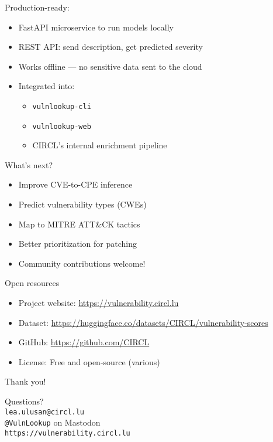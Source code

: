 \documentclass{beamer}
\begin{document}
\begin{frame}{Production-ready: }
    \begin{itemize}
        \item FastAPI microservice to run models locally
        \item REST API: send description, get predicted severity
        \item Works offline — no sensitive data sent to the cloud
        \item Integrated into:
            \begin{itemize}
                \item \texttt{vulnlookup-cli}
                \item \texttt{vulnlookup-web}
                \item CIRCL’s internal enrichment pipeline
            \end{itemize}
    \end{itemize}
\end{frame}

\begin{frame}{What’s next?}
    \begin{itemize}
        \item Improve CVE-to-CPE inference
        \item Predict vulnerability types (CWEs)
        \item Map to MITRE ATT\&CK tactics
        \item Better prioritization for patching
        \item Community contributions welcome!
    \end{itemize}
\end{frame}

\begin{frame}{Open resources}
    \begin{itemize}
        \item Project website: \url{https://vulnerability.circl.lu}
        \item Dataset: \url{https://huggingface.co/datasets/CIRCL/vulnerability-scores}
        \item GitHub: \url{https://github.com/CIRCL}
        \item License: Free and open-source (various)
    \end{itemize}
\end{frame}

\begin{frame}{Thank you!}
    \begin{center}
        Questions?\\[1em]
        \texttt{lea.ulusan@circl.lu} \\
        \texttt{@VulnLookup} on Mastodon \\
        \texttt{https://vulnerability.circl.lu}
    \end{center}
\end{frame}
\end{document}
